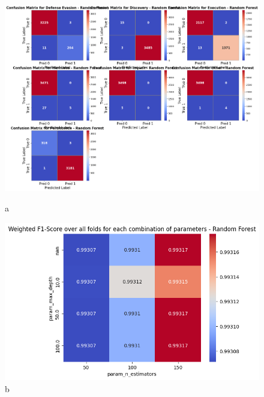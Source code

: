         \clearpage
    
        
        \begin{figure}[H]
        
            \centering
            
            \begin{minipage}{\textwidth}
                \begin{minipage}[c]{0.48\textwidth}
                    \centering
                    \includegraphics[width=\textwidth]{../figures/plots/section2/Random_Forest_base_evaluation.png}
                    \caption{a}
                    \label{fig:a}
                \end{minipage}%
                \hfill%
                \begin{minipage}[c]{0.48\textwidth}
                    \centering
                    \includegraphics[width=\textwidth]{../figures/plots/section2/weighted_f1_score_for_each_combination_of_parameters_random_forest.png}
                    \caption{b}
                    \label{fig:b}
                \end{minipage}
            \end{minipage}


\end{figure}
